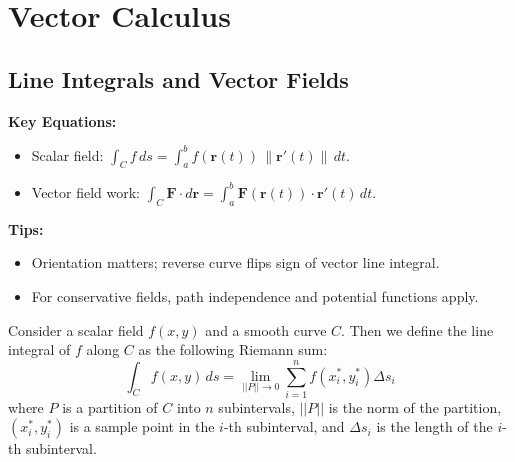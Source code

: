\documentclass[11pt]{report}
\begin{document}
\section{Vector Calculus}

\subsection{Line Integrals and Vector Fields}

\begin{keybox}
	\textbf{Key Equations:}
\begin{itemize}
    \item Scalar field: $\displaystyle \int_C f\,ds = \int_a^b f(\mathbf r(t))\,\lVert \mathbf r'(t)\rVert\,dt$.
    \item Vector field work: $\displaystyle \int_C \mathbf F\cdot d\mathbf r = \int_a^b \mathbf F(\mathbf r(t))\cdot\mathbf r'(t)\,dt$.
\end{itemize}
	\textbf{Tips:}
\begin{itemize}
    \item Orientation matters; reverse curve flips sign of vector line integral.
    \item For conservative fields, path independence and potential functions apply.
\end{itemize}
\end{keybox}
\begin{definition}
    Consider a scalar field $f(x,y) $ and a smooth curve $C$. Then we define the line integral of $f$ along $C$ as the following Riemann sum:
    $$
        \int_C f(x,y) \, ds = \lim_{||P|| \to 0} \sum_{i=1}^n f(x_i^*, y_i^*) \Delta s_i
    $$
    where $P$ is a partition of $C$ into $n$ subintervals, $||P||$ is the norm of the partition, $(x_i^*, y_i^*)$ is a sample point in the $i$-th subinterval, and $\Delta s_i$ is the length of the $i$-th subinterval.
\end{definition}
\end{document}
